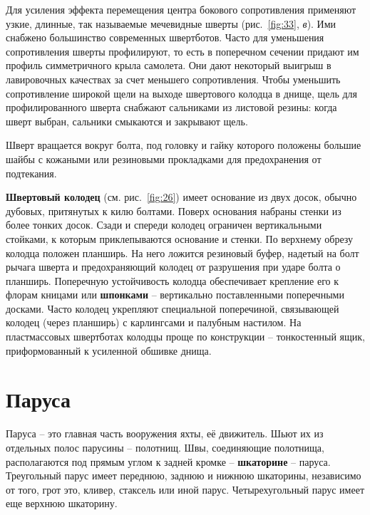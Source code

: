 \documentclass[a4paper, 12pt, twoside, final]{scrbook}
\begin{document}
Для усиления эффекта перемещения центра бокового сопротивления применяют
узкие, длинные, так называемые мечевидные шверты (рис.~\ref{fig:33},
\emph{в}). Ими снабжено большинство современных швертботов. Часто
для уменьшения сопротивления шверты профилируют, то есть в поперечном
сечении придают им профиль симметричного крыла самолета. Они дают
некоторый выигрыш в лавировочных качествах за счет меньшего сопротивления.
Чтобы уменьшить сопротивление широкой щели на выходе швертового колодца
в днище, щель для профилированного шверта снабжают сальниками из листовой
резины: когда шверт выбран, сальники смыкаются и закрывают щель.

Шверт вращается вокруг болта, под головку и гайку которого положены
большие шайбы с кожаными или резиновыми прокладками для предохранения
от подтекания.

\textbf{Швертовый колодец} (см. рис.~\ref{fig:26})
имеет основание из двух досок, обычно дубовых, притянутых к килю болтами.
Поверх основания набраны стенки из более тонких досок. Сзади и спереди
колодец ограничен вертикальными стойками, к которым приклепываются
основание и стенки. По верхнему обрезу колодца положен планширь. На
него ложится резиновый буфер, надетый на болт рычага шверта и предохраняющий
колодец от разрушения при ударе болта о планширь. Поперечную устойчивость
колодца обеспечивает крепление его к флорам кницами или \textbf{шпонками}
\--- вертикально поставленными поперечными досками. Часто колодец укрепляют
специальной поперечиной, связывающей колодец (через планширь) с карлингсами
и палубным настилом. На пластмассовых швертботах колодцы проще по
конструкции \--- тонкостенный ящик, приформованный к усиленной обшивке
днища. 

%
%

\section{Паруса}

Паруса \--- это главная часть вооружения яхты, её движитель. Шьют их
из отдельных полос парусины \--- полотнищ. Швы, соединяющие полотнища,
располагаются под прямым углом к задней кромке \--- \textbf{шкаторине}
\--- паруса. Треугольный парус имеет переднюю, заднюю и нижнюю шкаторины,
независимо от того, грот это, кливер, стаксель или иной парус. Четырехугольный
парус имеет еще верхнюю шкаторину.
\end{document}
